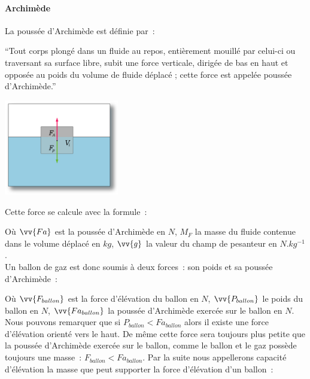 \documentclass[a4paper,11pt]{article}
\begin{document}
\paragraph{Archimède}

La poussée d'Archimède est définie par~:

\enquote{Tout corps plongé dans un fluide au repos, entièrement mouillé par celui-ci ou traversant sa surface libre, subit une force verticale, dirigée de bas en haut et opposée au poids du volume de fluide déplacé ; cette force est appelée poussée d'Archimède.}

\begin{center}
	\includegraphics[width=5cm]{../Images/pousse_archimede.png}
\end{center}

Cette force se calcule avec la formule~:

\begin{center}
\end{center}

Où $\vv{Fa}$ est la poussée d'Archimède en $N$, $M_F$ la masse du fluide contenue dans le volume déplacé en $kg$, $\vv{g}$ la valeur du champ de pesanteur en $N.kg^{-1}$. \\

Un ballon de gaz est donc soumis à deux forces~: son poids et sa poussée d'Archimède~:

\begin{center}
\end{center}

Où $\vv{F_{ballon}}$ est la force d'élévation du ballon en $N$, $\vv{P_{ballon}}$ le poids du ballon en $N$, $\vv{Fa_{ballon}}$ la poussée d'Archimède exercée sur le ballon en $N$. \\

Nous pouvons remarquer que si $P_{ballon} < Fa_{ballon}$ alors il existe une force d'élévation orienté vers le haut. De même cette force sera toujours  plus petite que la poussée d'Archimède exercée sur le ballon, comme le ballon et le gaz possède toujours une masse~: $F_{ballon} < Fa_{ballon}$.
Par la suite nous appellerons capacité d'élévation la masse que peut supporter la force d'élévation d'un ballon~:
\begin{center}
\end{center}
\end{document}
